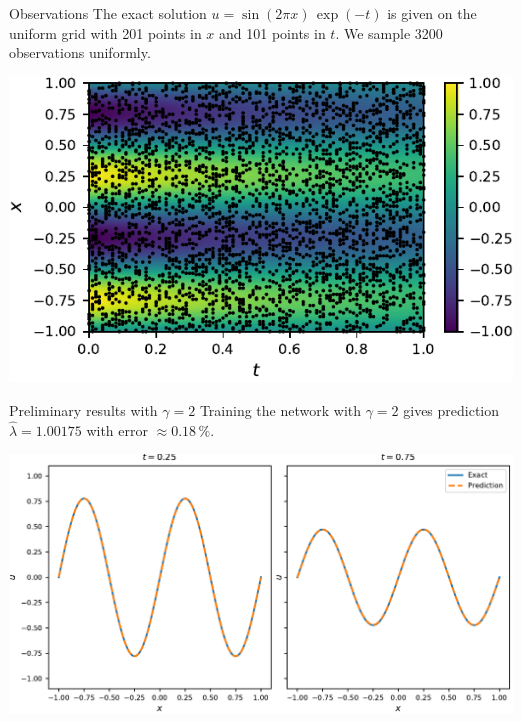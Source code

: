 \documentclass{beamer}
\begin{document}
\begin{frame}{Observations}
The exact solution $u = \sin(2\pi x) \, \exp(-t)$ is given on the uniform grid
with 201 points in $x$ and 101 points in $t$. 
We sample 3200 observations uniformly.

\centering
\includegraphics{images/heateq-observations}
\end{frame}

\begin{frame}{Preliminary results with $\gamma=2$}
Training the network with $\gamma=2$ gives prediction $\widehat{\lambda} =
1.00175$ with error $\approx 0.18 \,\%$.

\vspace{0.5cm}
\centering
\includegraphics[scale=0.55]{images/heateq-predictions}

\end{frame}



\end{document}
